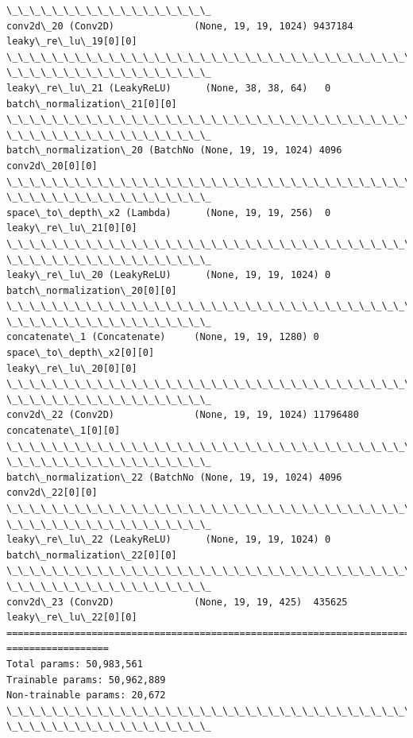 \documentclass[11pt]{article}
\begin{document}
\begin{Verbatim}[commandchars=\\\{\}]
\_\_\_\_\_\_\_\_\_\_\_\_\_\_\_\_\_\_
conv2d\_20 (Conv2D)              (None, 19, 19, 1024) 9437184
leaky\_re\_lu\_19[0][0]
\_\_\_\_\_\_\_\_\_\_\_\_\_\_\_\_\_\_\_\_\_\_\_\_\_\_\_\_\_\_\_\_\_\_\_\_\_\_\_\_\_\_\_\_\_\_\_\_\_\_\_\_\_\_\_\_\_\_\_\_\_\_\_\_\_\_\_\_\_\_\_\_\_\_\_\_\_\_\_\_
\_\_\_\_\_\_\_\_\_\_\_\_\_\_\_\_\_\_
leaky\_re\_lu\_21 (LeakyReLU)      (None, 38, 38, 64)   0
batch\_normalization\_21[0][0]
\_\_\_\_\_\_\_\_\_\_\_\_\_\_\_\_\_\_\_\_\_\_\_\_\_\_\_\_\_\_\_\_\_\_\_\_\_\_\_\_\_\_\_\_\_\_\_\_\_\_\_\_\_\_\_\_\_\_\_\_\_\_\_\_\_\_\_\_\_\_\_\_\_\_\_\_\_\_\_\_
\_\_\_\_\_\_\_\_\_\_\_\_\_\_\_\_\_\_
batch\_normalization\_20 (BatchNo (None, 19, 19, 1024) 4096        conv2d\_20[0][0]
\_\_\_\_\_\_\_\_\_\_\_\_\_\_\_\_\_\_\_\_\_\_\_\_\_\_\_\_\_\_\_\_\_\_\_\_\_\_\_\_\_\_\_\_\_\_\_\_\_\_\_\_\_\_\_\_\_\_\_\_\_\_\_\_\_\_\_\_\_\_\_\_\_\_\_\_\_\_\_\_
\_\_\_\_\_\_\_\_\_\_\_\_\_\_\_\_\_\_
space\_to\_depth\_x2 (Lambda)      (None, 19, 19, 256)  0
leaky\_re\_lu\_21[0][0]
\_\_\_\_\_\_\_\_\_\_\_\_\_\_\_\_\_\_\_\_\_\_\_\_\_\_\_\_\_\_\_\_\_\_\_\_\_\_\_\_\_\_\_\_\_\_\_\_\_\_\_\_\_\_\_\_\_\_\_\_\_\_\_\_\_\_\_\_\_\_\_\_\_\_\_\_\_\_\_\_
\_\_\_\_\_\_\_\_\_\_\_\_\_\_\_\_\_\_
leaky\_re\_lu\_20 (LeakyReLU)      (None, 19, 19, 1024) 0
batch\_normalization\_20[0][0]
\_\_\_\_\_\_\_\_\_\_\_\_\_\_\_\_\_\_\_\_\_\_\_\_\_\_\_\_\_\_\_\_\_\_\_\_\_\_\_\_\_\_\_\_\_\_\_\_\_\_\_\_\_\_\_\_\_\_\_\_\_\_\_\_\_\_\_\_\_\_\_\_\_\_\_\_\_\_\_\_
\_\_\_\_\_\_\_\_\_\_\_\_\_\_\_\_\_\_
concatenate\_1 (Concatenate)     (None, 19, 19, 1280) 0
space\_to\_depth\_x2[0][0]
leaky\_re\_lu\_20[0][0]
\_\_\_\_\_\_\_\_\_\_\_\_\_\_\_\_\_\_\_\_\_\_\_\_\_\_\_\_\_\_\_\_\_\_\_\_\_\_\_\_\_\_\_\_\_\_\_\_\_\_\_\_\_\_\_\_\_\_\_\_\_\_\_\_\_\_\_\_\_\_\_\_\_\_\_\_\_\_\_\_
\_\_\_\_\_\_\_\_\_\_\_\_\_\_\_\_\_\_
conv2d\_22 (Conv2D)              (None, 19, 19, 1024) 11796480
concatenate\_1[0][0]
\_\_\_\_\_\_\_\_\_\_\_\_\_\_\_\_\_\_\_\_\_\_\_\_\_\_\_\_\_\_\_\_\_\_\_\_\_\_\_\_\_\_\_\_\_\_\_\_\_\_\_\_\_\_\_\_\_\_\_\_\_\_\_\_\_\_\_\_\_\_\_\_\_\_\_\_\_\_\_\_
\_\_\_\_\_\_\_\_\_\_\_\_\_\_\_\_\_\_
batch\_normalization\_22 (BatchNo (None, 19, 19, 1024) 4096        conv2d\_22[0][0]
\_\_\_\_\_\_\_\_\_\_\_\_\_\_\_\_\_\_\_\_\_\_\_\_\_\_\_\_\_\_\_\_\_\_\_\_\_\_\_\_\_\_\_\_\_\_\_\_\_\_\_\_\_\_\_\_\_\_\_\_\_\_\_\_\_\_\_\_\_\_\_\_\_\_\_\_\_\_\_\_
\_\_\_\_\_\_\_\_\_\_\_\_\_\_\_\_\_\_
leaky\_re\_lu\_22 (LeakyReLU)      (None, 19, 19, 1024) 0
batch\_normalization\_22[0][0]
\_\_\_\_\_\_\_\_\_\_\_\_\_\_\_\_\_\_\_\_\_\_\_\_\_\_\_\_\_\_\_\_\_\_\_\_\_\_\_\_\_\_\_\_\_\_\_\_\_\_\_\_\_\_\_\_\_\_\_\_\_\_\_\_\_\_\_\_\_\_\_\_\_\_\_\_\_\_\_\_
\_\_\_\_\_\_\_\_\_\_\_\_\_\_\_\_\_\_
conv2d\_23 (Conv2D)              (None, 19, 19, 425)  435625
leaky\_re\_lu\_22[0][0]
================================================================================
==================
Total params: 50,983,561
Trainable params: 50,962,889
Non-trainable params: 20,672
\_\_\_\_\_\_\_\_\_\_\_\_\_\_\_\_\_\_\_\_\_\_\_\_\_\_\_\_\_\_\_\_\_\_\_\_\_\_\_\_\_\_\_\_\_\_\_\_\_\_\_\_\_\_\_\_\_\_\_\_\_\_\_\_\_\_\_\_\_\_\_\_\_\_\_\_\_\_\_\_
\_\_\_\_\_\_\_\_\_\_\_\_\_\_\_\_\_\_
    \end{Verbatim}
\end{document}
